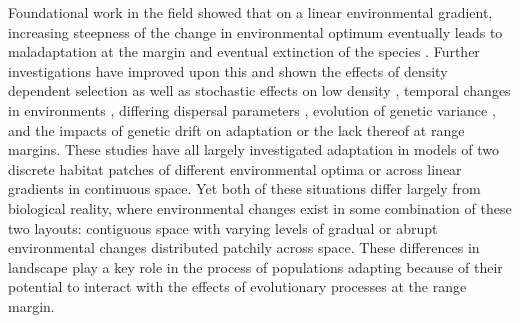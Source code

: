 Foundational work in the field showed that on a linear environmental gradient, increasing steepness of the change in environmental optimum eventually leads to maladaptation at the margin and eventual extinction of the species \citep{Kirkpatrick:1997}. %
Further investigations have improved upon this and shown the effects of density dependent selection \citep{GarciaRamos:1997} as well as stochastic effects on low density \citep{Bridle:2010}, temporal changes in environments \citep{Pease:1989}, differing dispersal parameters \citep{Aguilee:2012}, evolution of genetic variance \citep{Barton:2001,Polechova:2009}, and the impacts of genetic drift  \citep{Polechova:2015} on adaptation or the lack thereof at range margins. %
These studies have all largely investigated adaptation in models of two discrete habitat patches of different environmental optima or across linear gradients in continuous space. Yet both of these situations differ largely from biological reality, where environmental changes exist in some combination of these two layouts: contiguous space with varying levels of gradual or abrupt environmental changes distributed patchily across space. %
These differences in landscape play a key role in the process of populations adapting because of their potential to interact with the effects of evolutionary processes at the range margin. 

